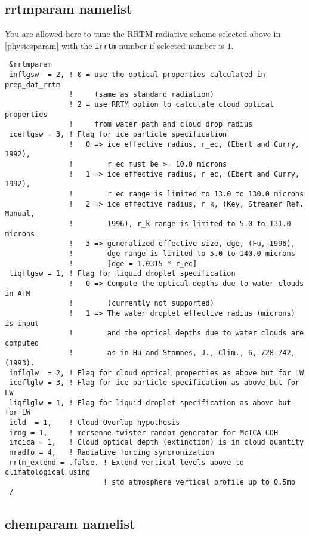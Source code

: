 \subsection{rrtmparam namelist}

You are allowed here to tune the RRTM radiative scheme selected above in
\ref{physicsparam} with the \verb=irrtm= number if selected number is $1$. 

{\footnotesize
\begin{Verbatim}
 &rrtmparam
 inflgsw  = 2, ! 0 = use the optical properties calculated in prep_dat_rrtm
               !     (same as standard radiation)
               ! 2 = use RRTM option to calculate cloud optical properties
               !     from water path and cloud drop radius
 iceflgsw = 3, ! Flag for ice particle specification
               !   0 => ice effective radius, r_ec, (Ebert and Curry, 1992),
               !        r_ec must be >= 10.0 microns
               !   1 => ice effective radius, r_ec, (Ebert and Curry, 1992),
               !        r_ec range is limited to 13.0 to 130.0 microns
               !   2 => ice effective radius, r_k, (Key, Streamer Ref. Manual,
               !        1996), r_k range is limited to 5.0 to 131.0 microns
               !   3 => generalized effective size, dge, (Fu, 1996),
               !        dge range is limited to 5.0 to 140.0 microns
               !        [dge = 1.0315 * r_ec]
 liqflgsw = 1, ! Flag for liquid droplet specification
               !   0 => Compute the optical depths due to water clouds in ATM
               !        (currently not supported)
               !   1 => The water droplet effective radius (microns) is input
               !        and the optical depths due to water clouds are computed
               !        as in Hu and Stamnes, J., Clim., 6, 728-742, (1993).
 inflglw  = 2, ! Flag for cloud optical properties as above but for LW
 iceflglw = 3, ! Flag for ice particle specification as above but for LW
 liqflglw = 1, ! Flag for liquid droplet specification as above but for LW
 icld  = 1,    ! Cloud Overlap hypothesis
 irng = 1,     ! mersenne twister random generator for McICA COH
 imcica = 1,   ! Cloud optical depth (extinction) is in cloud quantity
 nradfo = 4,   ! Radiative forcing syncronization
 rrtm_extend = .false. ! Extend vertical levels above to climatological using
                       ! std atmosphere vertical profile up to 0.5mb
 /
\end{Verbatim}
}

\subsection{chemparam namelist}
\label{chemparam}

